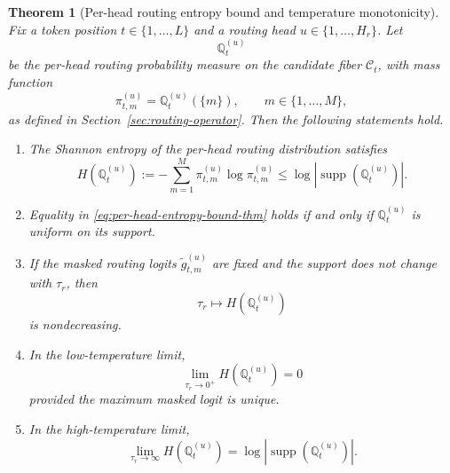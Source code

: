 \documentclass{article}
\theoremstyle{plain}
\newtheorem{theorem}{Theorem}[section]
\theoremstyle{definition}
\theoremstyle{remark}
\begin{document}
\begin{theorem}[Per-head routing entropy bound and temperature monotonicity]
\label{thm:per-head-entropy}
Fix a token position $t \in \{1,\dots,L\}$ and a routing head $u \in \{1,\dots,H_r\}$. Let
\[
\mathbb{Q}^{(u)}_{t}
\]
be the per-head routing probability measure on the candidate fiber $\mathcal{C}_{t}$, with mass function
\[
\pi^{(u)}_{t,m} = \mathbb{Q}^{(u)}_{t}(\{m\}), \qquad m \in \{1,\dots,M\},
\]
as defined in Section~\ref{sec:routing-operator}. Then the following statements hold.

\begin{enumerate}
    \item The Shannon entropy of the per-head routing distribution satisfies
    \begin{equation}
    \label{eq:per-head-entropy-bound-thm}
    H\!\left(\mathbb{Q}^{(u)}_{t}\right)
    :=
    - \sum_{m=1}^{M} \pi^{(u)}_{t,m}\log \pi^{(u)}_{t,m}
    \leq
    \log \left| \operatorname{supp}\!\left(\mathbb{Q}^{(u)}_{t}\right)\right|.
    \end{equation}

    \item Equality in \eqref{eq:per-head-entropy-bound-thm} holds if and only if $\mathbb{Q}^{(u)}_{t}$ is uniform on its support.

    \item If the masked routing logits $\tilde g^{(u)}_{t,m}$ are fixed and the support does not change with $\tau_r$, then
    \begin{equation}
    \label{eq:entropy-monotone-temp}
    \tau_r \longmapsto H\!\left(\mathbb{Q}^{(u)}_{t}\right)
    \end{equation}
    is nondecreasing.

    \item In the low-temperature limit,
    \begin{equation}
    \label{eq:entropy-low-temp-limit}
    \lim_{\tau_r \to 0^+} H\!\left(\mathbb{Q}^{(u)}_{t}\right)=0
    \end{equation}
    provided the maximum masked logit is unique.

    \item In the high-temperature limit,
    \begin{equation}
    \label{eq:entropy-high-temp-limit}
    \lim_{\tau_r\to\infty} H\!\left(\mathbb{Q}^{(u)}_{t}\right)
    =
    \log \left|\operatorname{supp}\!\left(\mathbb{Q}^{(u)}_{t}\right)\right|.
    \end{equation}
\end{enumerate}
\end{theorem}
\end{document}
